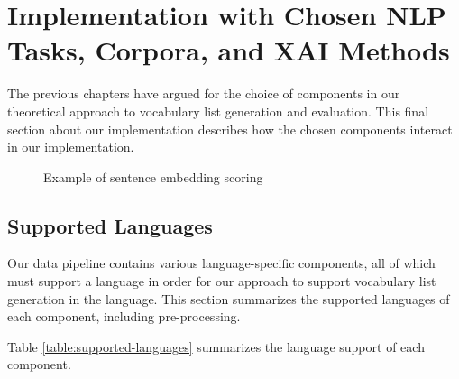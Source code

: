 %
%
\section{Implementation with Chosen NLP Tasks, Corpora, and XAI Methods} \label{sec:implementation-final}
The previous chapters have argued for the choice of components in our theoretical approach to vocabulary list generation and evaluation.
This final section about our implementation describes how the chosen components interact in our implementation.


\begin{figure}[H]
	
	\caption{Example of sentence embedding scoring}
	\label{fig:list-evaluation-diagram}
\end{figure}

\subsection{Supported Languages}
Our data pipeline contains various language-specific components, all of which must support a language in order for our approach to support vocabulary list generation in the language.
This section summarizes the supported languages of each component, including pre-processing.

Table \ref{table:supported-languages} summarizes the language support of each component.

